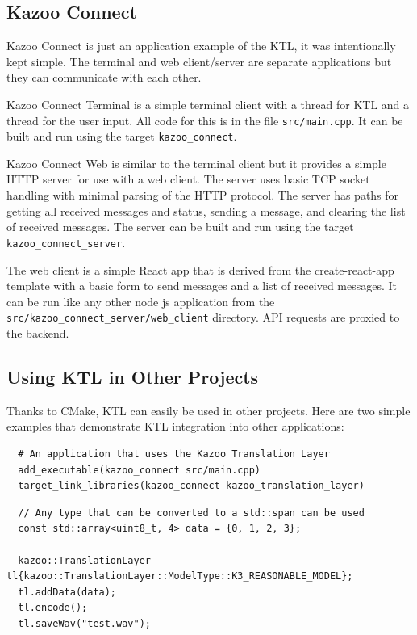 \documentclass[]{article}
\begin{document}
\subsection{Kazoo Connect}

Kazoo Connect is just an application example of the KTL, it was intentionally kept simple. The terminal and web client/server are separate applications but they can communicate with each other.


Kazoo Connect Terminal is a simple terminal client with a thread for KTL and a thread for the user input. All code for this is in the file \texttt{src/main.cpp}. It can be built and run using the target \texttt{kazoo\_connect}.


Kazoo Connect Web is similar to the terminal client but it provides a simple HTTP server for use with a web client. The server uses basic TCP socket handling with minimal parsing of the HTTP protocol. The server has paths for getting all received messages and status, sending a message, and clearing the list of received messages. The server can be built and run using the target \texttt{kazoo\_connect\_server}.

The web client is a simple React app that is derived from the create-react-app template with a basic form to send messages and a list of received messages. It can be run like any other node js application from the \texttt{src/kazoo\_connect\_server/web\_client} directory. API requests are proxied to the backend.


\subsection{Using KTL in Other Projects}

Thanks to CMake, KTL can easily be used in other projects. Here are two simple examples that demonstrate KTL integration into other applications:

\begin{verbatim}
  # An application that uses the Kazoo Translation Layer
  add_executable(kazoo_connect src/main.cpp)
  target_link_libraries(kazoo_connect kazoo_translation_layer)
\end{verbatim}


\begin{verbatim}
  // Any type that can be converted to a std::span can be used
  const std::array<uint8_t, 4> data = {0, 1, 2, 3};

  kazoo::TranslationLayer tl{kazoo::TranslationLayer::ModelType::K3_REASONABLE_MODEL};
  tl.addData(data);
  tl.encode();
  tl.saveWav("test.wav");
\end{verbatim}
\end{document}

